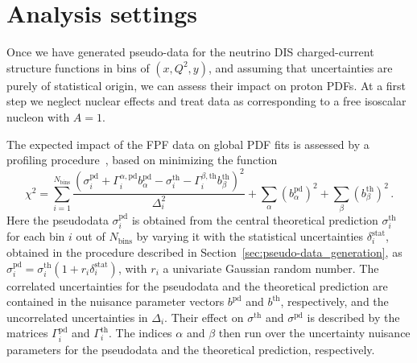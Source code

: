 \section{Analysis settings}
\label{sec:settings}

Once we have generated pseudo-data for the 
neutrino DIS charged-current structure functions
in bins of $(x,Q^2,y)$, and assuming that uncertainties
are purely of statistical origin, we can assess their
impact on proton PDFs.
%
At a first step we neglect nuclear effects
and treat data as corresponding to a free isoscalar
nucleon with $A=1$.

The expected impact of the FPF data on global PDF fits is assessed by a profiling procedure~\cite{Paukkunen:2014zia, Schmidt:2018hvu, AbdulKhalek:2018rok, HERAFitterdevelopersTeam:2015cre}, based on minimizing the function
\begin{equation}
\chi^2 = 
\sum_{i=1}^{N_{\textrm{bins}}} 
\frac{\left(  \sigma_i^{\textrm{pd}}
            + \Gamma_i^{\alpha,\textrm{pd}}
              b_\alpha^{\textrm{pd}}
            - \sigma_i^{\textrm{th}}
            - \Gamma_i^{\beta,\textrm{th}}
              b_\beta^{\textrm{th}}
     \right)^2
     }{\Delta_i^2}
+ \sum_\alpha (b_\alpha^{\textrm{pd}})^2
+ \sum_\beta  (b_\beta^{\textrm{th}})^2 \, .
\label{eq:profilingchi2}
\end{equation}
Here the pseudodata 
$\sigma_i^{\textrm{pd}}$ 
is obtained from the central theoretical prediction 
$\sigma_i^{\textrm{th}}$ 
for each bin $i$ out of $N_{\textrm{bins}}$ by varying it with the statistical uncertainties 
$\delta_i^{\textrm{stat}}$, 
obtained in the procedure described in Section~\ref{sec:pseudo-data_generation}, 
as 
$\sigma_i^{\textrm{pd}} = \sigma_i^{\textrm{th}}(1 + r_i \delta_i^{\textrm{stat}})$, 
with $r_i$ a univariate Gaussian random number.
%
The correlated uncertainties for the pseudodata and the theoretical prediction 
are contained in the nuisance parameter vectors $b^{\textrm{pd}}$ and $b^{\textrm{th}}$, respectively, and the uncorrelated uncertainties in $\Delta_i$.
%
Their effect on $\sigma^{\textrm{th}}$ and $\sigma^{\textrm{pd}}$
is described by the matrices $\Gamma_i^{\textrm{pd}}$ and $\Gamma_i^{\textrm{th}}$.
The indices $\alpha$ and $\beta$ then run over the uncertainty nuisance parameters for the pseudodata and the theoretical prediction, respectively.
